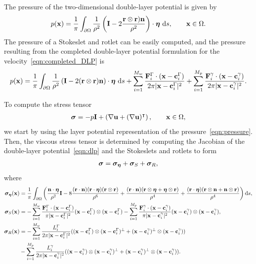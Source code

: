 \documentclass[preprint, 10pt]{elsarticle}
\begin{document}
The pressure of the two-dimensional double-layer potential is given by\cite{Power1993}
\begin{align*}
  p({\mathbf{x}}) = \frac{1}{\pi}\int_{\partial\Omega}\frac{1}{\rho^2}\left(
\mathbf{I} - 2\frac{{\mathbf{r}} \otimes {\mathbf{r}}){\mathbf{n}}}{\rho^2}\right)\cdot{\boldsymbol\eta}~\text{d}s,
\qquad{\mathbf{x}}\in\Omega.
\end{align*}
The pressure of a Stokeslet and rotlet can be easily computed,
and the pressure resulting from the completed double-layer potential
formulation for the velocity~\eqref{eqn:completed_DLP} is
\begin{align}
  \label{eqn:pressure} 
  p({\mathbf{x}}) = \frac{1}{\pi}\int_{\partial\Omega}\frac{1}{\rho^2}\left(
    \mathbf{I} - 2({\mathbf{r}} \otimes {\mathbf{r}}){\mathbf{n}}\right)\cdot{\boldsymbol\eta}~\text{d}s +
  \sum_{i=1}^{M_w}
  \frac{{\mathbf{F}}_i^\Gamma\cdot({\mathbf{x}}-{\mathbf{c}}_i^\Gamma)}{2\pi|{\mathbf{x}}-{\mathbf{c}}_i^{\Gamma}|^2}
  + \sum_{i=1}^{M_p}
    \frac{{\mathbf{F}}_i^\gamma\cdot({\mathbf{x}}-{\mathbf{c}}_i^\gamma)}{2\pi|{\mathbf{x}}-{\mathbf{c}}_i^\gamma|^2}.
\end{align}

To compute the stress tensor
\begin{align*} 
{\boldsymbol\sigma} = -p \mathbf{I} + \left(\nabla {\mathbf{u}} + (\nabla{\mathbf{u}})^\intercal\right), \qquad
{\mathbf{x}}\in\Omega,
\end{align*}
we start by using the layer potential representation of the
pressure~\eqref{eqn:pressure}.  Then, the viscous stress tensor is
determined by computing the Jacobian of the double-layer
potential~\eqref{eqn:dlp} and the Stokeslets and rotlets to form
\begin{align}
  \label{eqn:stress}
  {\boldsymbol\sigma} = {\boldsymbol\sigma}_{{\boldsymbol\eta}} + {\boldsymbol\sigma}_{S} + {\boldsymbol\sigma}_{R},
\end{align}
where
\begin{align*}
  {\boldsymbol\sigma}_{{\boldsymbol\eta}}({\mathbf{x}}) &= \frac{1}{\pi}\int_{\partial\Omega}\left( 
    \frac{{\mathbf{n}}\cdot{\boldsymbol\eta}}{\rho^2}\mathbf{I} 
    -8\frac{({\mathbf{r}}\cdot{\mathbf{n}})({\mathbf{r}}\cdot{\boldsymbol\eta})({\mathbf{r}}\otimes{\mathbf{r}})}{\rho^6} 
    +\frac{({\mathbf{r}}\cdot{\mathbf{n}})({\mathbf{r}}\otimes{\boldsymbol\eta} + {\boldsymbol\eta}\otimes{\mathbf{r}})}{\rho^4} 
+ \frac{({\mathbf{r}}\cdot{\boldsymbol\eta})({\mathbf{r}}\otimes{\mathbf{n}} +
{\mathbf{n}}\otimes{\mathbf{r}})}{\rho^4}\right)\text{d}s,\\
  {\boldsymbol\sigma}_S({\mathbf{x}}) &= -\sum_{i=1}^{M_w} 
    \frac{{\mathbf{F}}_i^\Gamma\cdot({\mathbf{x}} - {\mathbf{c}}_i^\Gamma)}{\pi|{\mathbf{x}}-{\mathbf{c}}_i^\Gamma|^2}
        ({\mathbf{x}} - {\mathbf{c}}_i^\Gamma)\otimes({\mathbf{x}} - {\mathbf{c}}_i^\Gamma)  -
    \sum_{i=1}^{M_p}
    \frac{{\mathbf{F}}_i^\gamma\cdot({\mathbf{x}} - {\mathbf{c}}_i^\gamma)}{\pi|{\mathbf{x}}-{\mathbf{c}}_i^\gamma|^2}
        ({\mathbf{x}}-{\mathbf{c}}_i^\gamma )\otimes({\mathbf{x}}-{\mathbf{c}}_i^\gamma),\\
{\boldsymbol\sigma}_R({\mathbf{x}}) &= -\sum_{i=1}^{M_w} \frac{L_i^\Gamma}{2\pi|{\mathbf{x}}-{\mathbf{c}}_i^\Gamma|^2}
(({\mathbf{x}}-{\mathbf{c}}_i^\Gamma)\otimes({\mathbf{x}}-{\mathbf{c}}_i^\Gamma)^\perp +
    ({\mathbf{x}}-{\mathbf{c}}_i^\gamma)^\perp\otimes({\mathbf{x}}-{\mathbf{c}}_i^\gamma))  \\
\qquad&-\sum_{i=1}^{M_p}
\frac{L_i^\gamma}{2\pi|{\mathbf{x}}-{\mathbf{c}}_i^\gamma|^2}
    (({\mathbf{x}}-{\mathbf{c}}_i^\gamma )\otimes({\mathbf{x}}-{\mathbf{c}}_i^\gamma)^\perp + 
    ({\mathbf{x}}-{\mathbf{c}}_i^\gamma)^\perp\otimes({\mathbf{x}}-{\mathbf{c}}_i^\gamma)).
\end{align*}
\end{document}
